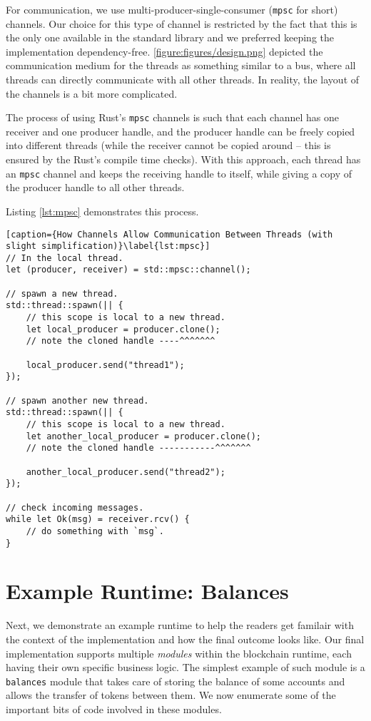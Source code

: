 For communication, we use multi-producer-single-consumer\cite{StdSyncMpsc} (\texttt{mpsc} for short)
channels. Our choice for this type of channel is restricted by the fact that this is the only one
available in the standard library and we preferred keeping the implementation dependency-free.
\ref{figure:figures/design.png} depicted the communication medium for the threads as something
similar to a bus, where all threads can directly communicate with all other threads. In reality, the
layout of the channels is a bit more complicated.

The process of using Rust's \texttt{mpsc} channels is such that each channel has one receiver and one
producer handle, and the producer handle can be freely copied into different threads (while the
receiver cannot be copied around -- this is ensured by the Rust's compile time checks). With this
approach, each thread has an \texttt{mpsc} channel and keeps the receiving handle to itself,
while giving a copy of the producer handle to all other threads.

Listing \ref{lst:mpsc} demonstrates this process.

\begin{lstlisting}[caption={How Channels Allow Communication Between Threads (with slight simplification)}\label{lst:mpsc}]
// In the local thread.
let (producer, receiver) = std::mpsc::channel();

// spawn a new thread.
std::thread::spawn(|| {
	// this scope is local to a new thread.
	let local_producer = producer.clone();
	// note the cloned handle ----^^^^^^^

	local_producer.send("thread1");
});

// spawn another new thread.
std::thread::spawn(|| {
	// this scope is local to a new thread.
	let another_local_producer = producer.clone();
	// note the cloned handle -----------^^^^^^^

	another_local_producer.send("thread2");
});

// check incoming messages.
while let Ok(msg) = receiver.rcv() {
	// do something with `msg`.
}
\end{lstlisting}


\section{Example Runtime: Balances} \label{chap_impl:sec:balances}

Next, we demonstrate an example runtime to help the readers get familair with the context of the implementation and how the final outcome looks like. Our final implementation supports 
multiple \textit{modules} within the blockchain runtime, each having their own specific business
logic. The simplest example of such module is a \texttt{balances} module that takes care of storing
the balance of some accounts and allows the transfer of tokens between them. We now enumerate some
of the important bits of code involved in these modules.

